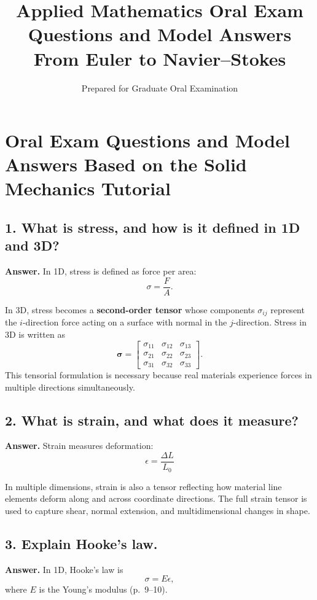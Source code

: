 \documentclass[12pt]{article}
\title{\vspace{-2em}\textbf{Applied Mathematics Oral Exam Questions and Model Answers}\\
\large From Euler to Navier--Stokes}
\author{Prepared for Graduate Oral Examination}
\date{}
\begin{document}
\section*{Oral Exam Questions and Model Answers Based on the Solid Mechanics Tutorial}

\subsection*{1. What is stress, and how is it defined in 1D and 3D?}

\textbf{Answer.}
In 1D, stress is defined as force per area:
\[
\sigma = \frac{F}{A}.
\]


In 3D, stress becomes a \textbf{second-order tensor} whose components 
$\sigma_{ij}$ represent the $i$-direction force acting on a surface with 
normal in the $j$-direction. Stress in 3D is written as
\[
\boldsymbol{\sigma} =
\begin{bmatrix}
\sigma_{11} & \sigma_{12} & \sigma_{13} \\
\sigma_{21} & \sigma_{22} & \sigma_{23} \\
\sigma_{31} & \sigma_{32} & \sigma_{33}
\end{bmatrix}.
\]
This tensorial formulation is necessary because real materials experience 
forces in multiple directions simultaneously.


\subsection*{2. What is strain, and what does it measure?}

\textbf{Answer.}
Strain measures deformation:
\[
\epsilon = \frac{\Delta L}{L_0}
\]


In multiple dimensions, strain is also a tensor reflecting how material
line elements deform along and across coordinate directions.  
The full strain tensor is used to capture shear, normal extension,
and multidimensional changes in shape.


\subsection*{3. Explain Hooke’s law.}

\textbf{Answer.}
In 1D, Hooke’s law is
\[
\sigma = E \epsilon,
\]
where $E$ is the Young’s modulus (p.~9–10).
\end{document}
